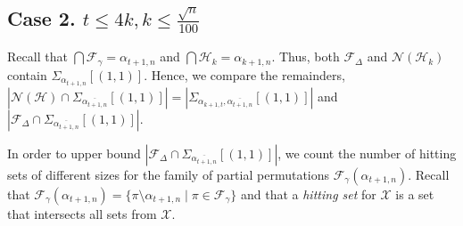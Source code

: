 \documentclass[11pt]{extarticle}
\numberwithin{equation}{section} %
\theoremstyle{plain}
\theoremstyle{definition}
\newcommand{\FF}{\mathcal{F}}
\newcommand{\ff}{\mathcal{F}}
\newcommand{\m}{\mathcal}
\newcommand{\HH}{\mathcal{H}}
\begin{document}
\subsection{\textbf{Case 2.} $t\leq 4k, k \leq \frac{\sqrt{n}}{100}$} 

     Recall that $\bigcap \FF_\gamma = \alpha_{t+1, n}$ and $\bigcap \HH_k = \alpha_{k+1, n}$. Thus, both $\ff_\Delta$ and $\m N(\m H_k)$ contain   $\Sigma_{\alpha_{t+1,n}}[(1,1)] $.  Hence, we compare the remainders, $|\m{N}(\HH)\cap \Sigma_{\overline{\alpha_{t+1,n}}}[(1, 1)]|=|\Sigma_{\alpha_{k+1,t}, \overline{\alpha_{t+1,n}}}[(1, 1)]|$ and $|\FF_\Delta \cap \Sigma_{ \overline{\alpha_{t+1,n}}}[(1, 1)]|.$ 
    

In order to upper bound $|\FF_\Delta \cap \Sigma_{ \overline{\alpha_{t+1,n}}}[(1, 1)]|$, we count the number of hitting sets of different sizes for the family of partial permutations $\FF_\gamma(\alpha_{t+1, n})$. Recall that  $\FF_\gamma(\alpha_{t+1, n}) = \{ \pi \setminus \alpha_{t+1, n} \mid \pi \in  \FF_\gamma\}$ and that a {\it hitting set} for $\m X$ is a set that intersects all sets from $\m X$.  
\end{document}
